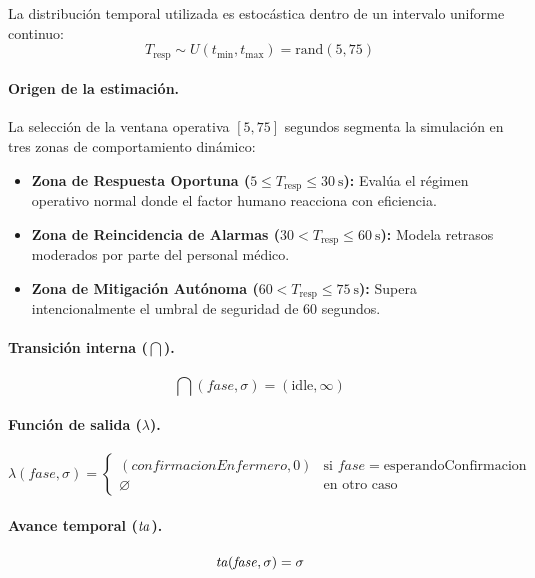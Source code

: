 La distribución temporal utilizada es estocástica dentro de un intervalo uniforme continuo:
\[
T_{\mathrm{resp}} \sim U(t_{\mathrm{min}}, t_{\mathrm{max}}) = \text{rand}(5, 75)
\]

\paragraph{Origen de la estimación.}
La selección de la ventana operativa $[5, 75]$ segundos segmenta la simulación en tres zonas de comportamiento dinámico:
\begin{itemize}
    \item \textbf{Zona de Respuesta Oportuna ($5 \le T_{\mathrm{resp}} \le 30\ \mathrm{s}$):} Evalúa el régimen operativo normal donde el factor humano reacciona con eficiencia.
    \item \textbf{Zona de Reincidencia de Alarmas ($30 < T_{\mathrm{resp}} \le 60\ \mathrm{s}$):} Modela retrasos moderados por parte del personal médico. 
    \item \textbf{Zona de Mitigación Autónoma ($60 < T_{\mathrm{resp}} \le 75\ \mathrm{s}$):} Supera intencionalmente el umbral de seguridad de 60 segundos. 
\end{itemize}

\paragraph{Transición interna ($\dint$).}
\[
\dint(\mathit{fase}, \sigma) = (\text{idle}, \infty)
\]

\paragraph{Función de salida ($\lambda$).}
\[
\lambda(\mathit{fase}, \sigma) =
\begin{cases}
(\mathit{confirmacionEnfermero}, 0) & \text{si } \mathit{fase} = \text{esperandoConfirmacion} \\[4pt]
\varnothing & \text{en otro caso}
\end{cases}
\]

\paragraph{Avance temporal ($\mathit{ta}$).}
\[
\mathit{ta}(\mathit{fase}, \sigma) = \sigma
\]